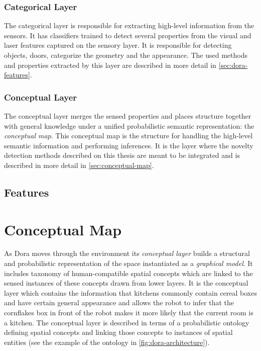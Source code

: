 \subsubsection*{Categorical Layer}
The categorical layer is responsible for extracting high-level information from the
sensors. It has classifiers trained to detect several properties from the visual and laser
features captured on the sensory layer.
It is responsible for detecting objects, doors, categorize the geometry and the appearance.
The used methods and properties extracted by this layer are described in more detail in
\autoref{sec:dora-features}.

\subsubsection*{Conceptual Layer}
The conceptual layer merges the sensed properties and places structure together
with general knowledge under a unified probabilistic semantic representation: the
\emph{conceptual map}.
This conceptual map is the structure for handling the high-level semantic information
and performing inferences. It is the layer where the novelty detection methods described
on this thesis are meant to be integrated and is described in more detail in
\autoref{sec:conceptual-map}.


\subsection{Features}
\label{sec:dora-features}


\section{Conceptual Map}
\label{sec:conceptual-map}
As \gls{Dora} moves through the environment its \emph{conceptual layer} builds a structural and
probabilistic representation of the space instantiated as a \emph{graphical model}.
It includes taxonomy of human\hyp{}compatible spatial concepts which are linked to the sensed 
instances of these concepts drawn from lower layers. It is the conceptual layer which 
contains the information that kitchens commonly contain cereal boxes and have certain 
general appearance and allows the robot to infer that the cornflakes box in front of the 
robot makes it more likely that the current room is a kitchen. The conceptual layer is 
described in terms of a probabilistic ontology defining spatial concepts and linking 
those concepts to instances of spatial entities (see the example of the ontology in
\autoref{fig:dora-architecture}).

